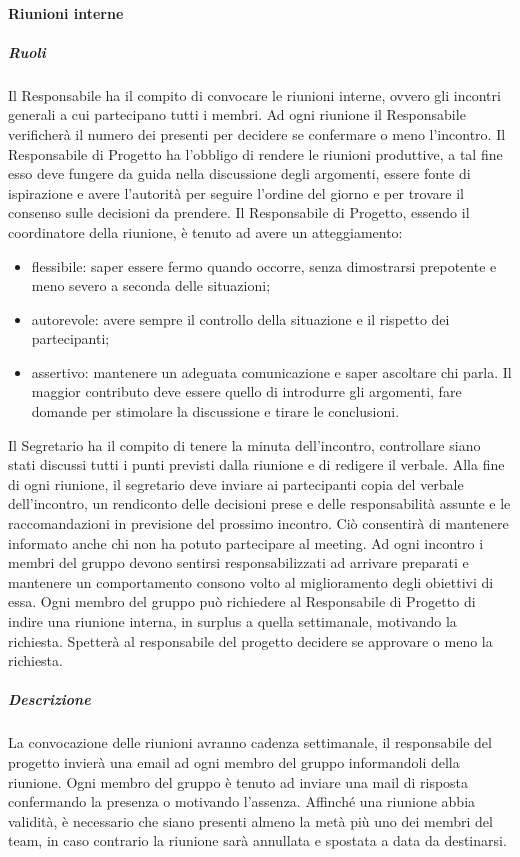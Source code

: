 \paragraph{Riunioni interne}
\subparagraph{Ruoli}
Il Responsabile ha il compito di convocare le riunioni interne, ovvero gli incontri generali a cui partecipano tutti i membri.
Ad ogni riunione il Responsabile verificherà il numero dei presenti per decidere se confermare o meno l'incontro.
Il Responsabile di Progetto ha l'obbligo di rendere le riunioni produttive, a tal fine 
esso deve fungere da guida nella discussione degli argomenti, essere fonte di ispirazione e avere l'autorità per seguire l'ordine del giorno e per trovare il consenso sulle decisioni da prendere.
Il Responsabile di Progetto, essendo il coordinatore della riunione, è tenuto ad avere un atteggiamento:
\begin{itemize}
\item
flessibile: saper essere fermo quando occorre, senza dimostrarsi prepotente e meno severo a seconda delle situazioni;
\item
autorevole: avere sempre il controllo della situazione e il rispetto dei partecipanti;
\item
assertivo: mantenere un adeguata comunicazione e saper ascoltare chi parla. Il maggior contributo deve essere quello di introdurre gli argomenti, fare domande per stimolare la discussione e tirare le conclusioni.
\end{itemize}
Il Segretario ha il compito di tenere la minuta dell'incontro, controllare siano stati discussi tutti i punti previsti dalla riunione e di redigere
il verbale. Alla fine di ogni riunione, il segretario deve inviare ai partecipanti copia del verbale dell'incontro, un rendiconto delle decisioni prese e delle responsabilità assunte e le raccomandazioni in previsione del prossimo incontro. Ciò consentirà di mantenere informato anche chi non ha potuto partecipare al meeting. 
Ad ogni incontro i membri del gruppo devono sentirsi responsabilizzati ad arrivare preparati e mantenere un comportamento consono volto al miglioramento degli obiettivi di essa.
Ogni membro del gruppo può richiedere al Responsabile di Progetto di indire una riunione interna, in surplus a quella settimanale, motivando la richiesta. Spetterà al responsabile del progetto decidere se approvare o meno la richiesta.
\subparagraph{Descrizione}
La convocazione delle riunioni avranno cadenza settimanale, il responsabile del progetto invierà una email ad ogni membro del gruppo informandoli della riunione.
Ogni membro del gruppo è tenuto ad inviare una mail di risposta confermando la presenza o motivando l'assenza.
Affinché una riunione abbia validità, è necessario che siano presenti almeno la metà più uno dei membri del team, in caso contrario la riunione sarà annullata e spostata a data da destinarsi.

